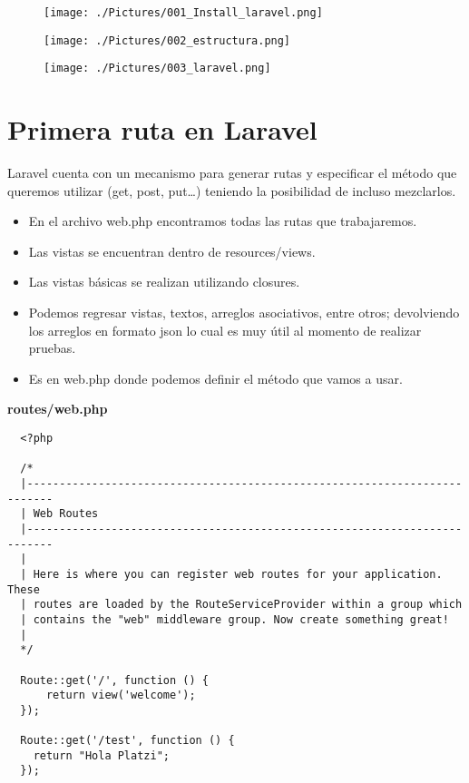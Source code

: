 \documentclass{article}
\begin{document}
\begin{figure}[h!]
  \centering
  \texttt{[image: ./Pictures/001\_Install\_laravel.png]}
\end{figure}

\begin{figure}[h!]
  \centering
  \texttt{[image: ./Pictures/002\_estructura.png]}
\end{figure}

\newpage

\begin{figure}[h!]
  \centering
  \texttt{[image: ./Pictures/003\_laravel.png]}
\end{figure}


\section{Primera ruta en Laravel}%
Laravel cuenta con un mecanismo para generar rutas y especificar el método que
queremos utilizar (get, post, put…) teniendo la posibilidad de incluso
mezclarlos.\\

\begin{itemize}
  \item En el archivo web.php encontramos todas las rutas que trabajaremos.
  \item Las vistas se encuentran dentro de resources/views.
  \item Las vistas básicas se realizan utilizando closures.
  \item Podemos regresar vistas, textos, arreglos asociativos, entre otros;
    devolviendo los arreglos en formato json lo cual es muy útil al momento de
    realizar pruebas.
  \item Es en web.php donde podemos definir el método que vamos a usar.
\end{itemize}


\textbf{routes/web.php}
\begin{verbatim}
  <?php

  /*
  |--------------------------------------------------------------------------
  | Web Routes
  |--------------------------------------------------------------------------
  |
  | Here is where you can register web routes for your application. These
  | routes are loaded by the RouteServiceProvider within a group which
  | contains the "web" middleware group. Now create something great!
  |
  */

  Route::get('/', function () {
      return view('welcome');
  });

  Route::get('/test', function () {
    return "Hola Platzi";
  });
\end{verbatim}
\end{document}
